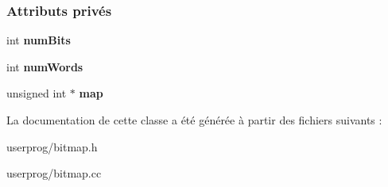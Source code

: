 \subsubsection*{Attributs privés}
\begin{DoxyCompactItemize}
\item 
\hypertarget{class_bit_map_ac13f86735997991d4a42a82904fdd92c}{}\label{class_bit_map_ac13f86735997991d4a42a82904fdd92c} 
int {\bfseries num\+Bits}
\item 
\hypertarget{class_bit_map_ae9ad600ac1b5845b31f03224b2635aab}{}\label{class_bit_map_ae9ad600ac1b5845b31f03224b2635aab} 
int {\bfseries num\+Words}
\item 
\hypertarget{class_bit_map_aaead652d4937378391587036e4853260}{}\label{class_bit_map_aaead652d4937378391587036e4853260} 
unsigned int $\ast$ {\bfseries map}
\end{DoxyCompactItemize}


La documentation de cette classe a été générée à partir des fichiers suivants \+:\begin{DoxyCompactItemize}
\item 
userprog/bitmap.\+h\item 
userprog/bitmap.\+cc\end{DoxyCompactItemize}
